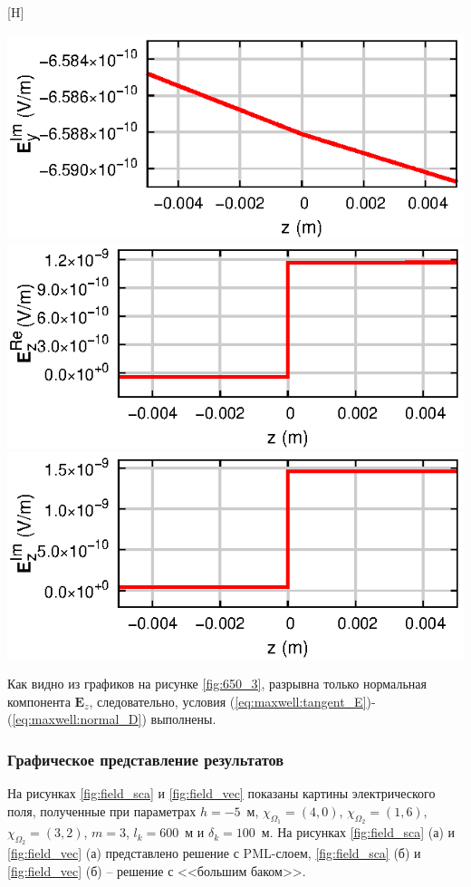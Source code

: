 \documentclass[a4paper,14pt]{article}
\makeatletter
\renewenvironment{figure}[1][\fps@figure]{
  \edef\@tempa{\noexpand\@float{figure}[#1]}
  \@tempa
  \addtocounter{foofigure}{1}
}{
  \end@float
}
\makeatother
\begin{document}
\begin{figure}[H]
	\includegraphics[scale=1]{research-2/650/EyI.eps}
	\includegraphics[scale=1]{research-2/650/EzR.eps}
	\includegraphics[scale=1]{research-2/650/EzI.eps}
	\caption{графики компонент электрического поля на контактных границах}
	\label{fig:650_3}
\end{figure}

Как видно из графиков на рисунке \ref{fig:650_3}, разрывна только нормальная компонента $\mathbf{E}_z$, следовательно, условия (\ref{eq:maxwell:tangent_E})-(\ref{eq:maxwell:normal_D}) выполнены.

\subsubsection{Графическое представление результатов}
На рисунках \ref{fig:field_sca} и \ref{fig:field_vec} показаны картины электрического поля, полученные при параметрах $h=-5$~м, $\chi_{\Omega_1} = (4, 0)$, $\chi_{\Omega_2} = (1, 6)$, $\chi_{\Omega_2} = (3, 2)$, $m=3$, $l_k = 600$~м и $\delta_k = 100$~м. На рисунках \ref{fig:field_sca} (а) и \ref{fig:field_vec} (а) представлено решение с PML-слоем, \ref{fig:field_sca} (б) и \ref{fig:field_vec} (б) -- решение с <<большим баком>>.
\end{document}
